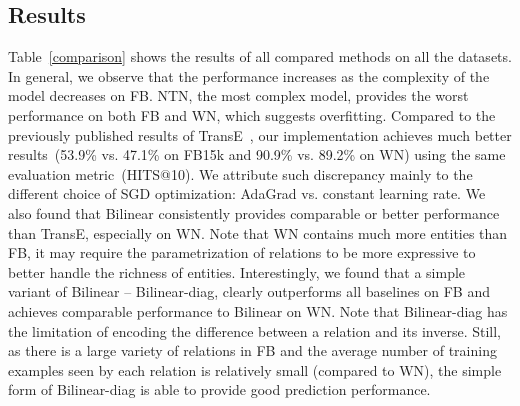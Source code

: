 \documentclass{article} \usepackage{iclr2015,times}
\begin{document}
\subsection{Results}
\begin{table*}[bth]
\begin{center}
\begin{footnotesize}
\end{footnotesize}
\caption{\label{comparison}Performance comparisons among different embedding models}
\end{center}
\end{table*}

Table~\ref{comparison} shows the results of all compared methods on all the datasets. In general, we observe that the performance increases as the complexity of the model decreases on FB. NTN, the most complex model, provides the worst performance on both FB and WN, which suggests overfitting. Compared to the previously published results of TransE~\citep{BordesUsGaWeYa2013}, our implementation achieves much better results~(53.9\% vs. 47.1\% on FB15k and 90.9\% vs. 89.2\% on WN) using the same evaluation metric~(HITS@10). We attribute such discrepancy mainly to the different choice of SGD optimization: AdaGrad vs. constant learning rate. We also found that Bilinear consistently provides comparable or better performance than TransE, especially on WN. Note that WN contains much more entities than FB, it may require the parametrization of relations to be more expressive to better handle the richness of entities. Interestingly, we found that a simple variant of Bilinear -- {\sc Bilinear-diag}, clearly outperforms all baselines on FB and achieves comparable performance to Bilinear on WN. Note that {\sc Bilinear-diag} has the limitation of encoding the difference between a relation and its inverse. Still, as there is a large variety of relations in FB and the average number of training examples seen by each relation is relatively small (compared to WN), the simple form of {\sc Bilinear-diag} is able to provide good prediction performance. 
\end{document}
